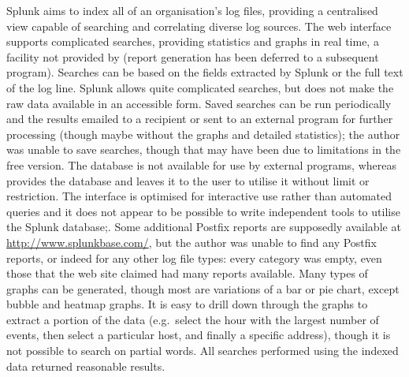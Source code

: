 Splunk aims to index all of an organisation's log files, providing a
centralised view capable of searching and correlating diverse log sources.
The web interface supports complicated searches, providing statistics and
graphs in real time, a facility not provided by \parsername{} (report
generation has been deferred to a subsequent program).  Searches can be
based on the fields extracted by Splunk or the full text of the log line.
Splunk allows quite complicated searches, but does not make the raw data
available in an accessible form.  Saved searches can be run periodically
and the results emailed to a recipient or sent to an external program for
further processing (though maybe without the graphs and detailed
statistics); the author was unable to save searches, though that may have
been due to limitations in the free version.  The database is not available
for use by external programs, whereas \parsername{} provides the database
and leaves it to the user to utilise it without limit or restriction.  The
interface is optimised for interactive use rather than automated queries
and it does not appear to be possible to write independent tools to utilise
the Splunk database;.  Some additional Postfix reports are supposedly
available at \url{http://www.splunkbase.com/}, but the author was unable to
find any Postfix reports, or indeed for any other log file types: every
category was empty, even those that the web site claimed had many reports
available.  Many types of graphs can be generated, though most are
variations of a bar or pie chart, except bubble and heatmap graphs.  It is
easy to drill down through the graphs to extract a portion of the data
(e.g.\ select the hour with the largest number of events, then select a
particular host, and finally a specific address), though it is not possible
to search on partial words.  All searches performed using the indexed data
returned reasonable results.

